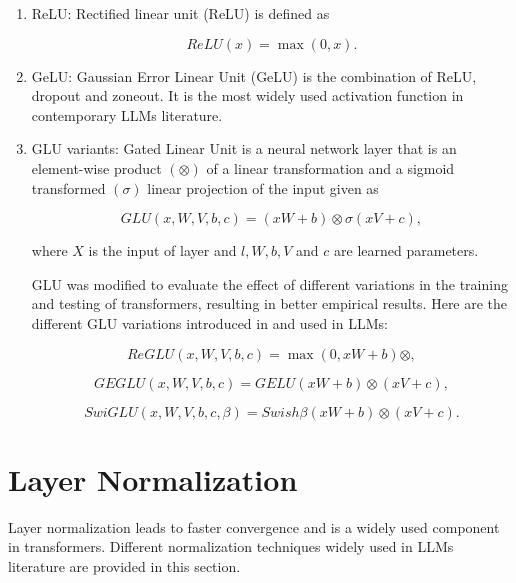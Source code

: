 \documentclass[a4paper,oneside]{book}
\begin{document}
\begin{enumerate}
  \item ReLU: Rectified linear unit (ReLU) is defined as

        \begin{equation}
          ReLU(x)=\max(0, x).
        \end{equation}

  \item GeLU: Gaussian Error Linear Unit (GeLU) is the combination of ReLU, dropout and zoneout. It is the most widely used activation function in contemporary LLMs literature.

  \item GLU variants: Gated Linear Unit is a neural network layer that is an element-wise product $(\otimes)$ of a linear transformation and a sigmoid transformed $(\sigma)$ linear projection of the input given as

        \begin{equation}
          GLU(x, W, V, b, c)=(xW + b) \otimes \sigma(xV + c),
        \end{equation}

        where $X$ is the input of layer and $l, W, b, V$ and $c$ are learned parameters.

        GLU was modified to evaluate the effect of different variations in the training and testing of transformers, resulting in better empirical results. Here are the different GLU variations introduced in and used in LLMs:

        \begin{equation}
          ReGLU(x, W, V, b, c) = \max (0, xW + b) \otimes,
        \end{equation}

        \begin{equation}
          GEGLU(x, W, V, b, c) = GELU(xW + b) \otimes(xV + c),
        \end{equation}

        \begin{equation}
          SwiGLU(x, W, V, b, c, \beta) = Swish \beta(xW + b) \otimes(xV + c).
        \end{equation}
\end{enumerate}

\section{Layer Normalization}
Layer normalization leads to faster convergence and is a widely used component in transformers. Different normalization techniques widely used in LLMs literature are provided in this section.
\end{document}
